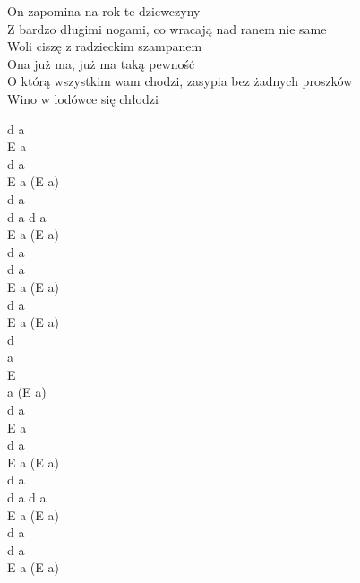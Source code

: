 \documentclass[a5paper, 10pt]{book}
\begin{document}
\begin{minipage}[t]{0.85\textwidth}
  \hspace*{1mm} On zapomina na rok te dziewczyny\\
  \hspace*{1mm} Z bardzo długimi nogami, co wracają nad ranem nie same\\
  \hspace*{1mm} Woli ciszę z radzieckim szampanem\\

  \hspace*{1mm} Ona już ma, już ma taką pewność\\
  \hspace*{1mm} O którą wszystkim wam chodzi, zasypia bez żadnych proszków\\
  \hspace*{1mm} Wino w lodówce się chłodzi\\

\end{minipage}
\begin{minipage}[t]{0.15\textwidth}
  d a\\
  E a\\
  d a\\
  E a (E a)\\

  d a\\
  d a d a\\
  E a (E a)\\

  d a\\
  d a\\
  E a (E a)\\

  d a\\
  E a (E a)\\
  d\\
  a\\
  E\\
  a (E a) \\

  d a\\
  E a\\
  d a\\
  E a (E a)\\

  d a\\
  d a d a\\
  E a (E a)\\

  d a\\
  d a\\
  E a (E a)\\

\end{minipage}
\end{document}
